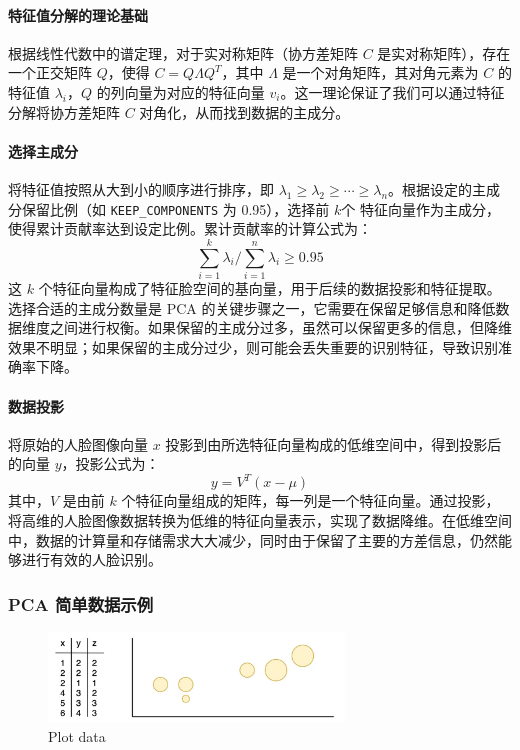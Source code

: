 \documentclass{article}
\begin{document}
\paragraph{特征值分解的理论基础}
根据线性代数中的谱定理，对于实对称矩阵（协方差矩阵 $C$ 是实对称矩阵），存在一个正交矩阵 $Q$，使得 $C = Q\Lambda Q^{T}$，其中 $\Lambda$ 是一个对角矩阵，其对角元素为 $C$ 的特征值 $\lambda_{i}$，$Q$ 的列向量为对应的特征向量 $v_{i}$。这一理论保证了我们可以通过特征分解将协方差矩阵 $C$ 对角化，从而找到数据的主成分。

\paragraph{选择主成分}
将特征值按照从大到小的顺序进行排序，即 $\lambda_{1}\geq\lambda_{2}\geq\cdots\geq\lambda_{n}$。根据设定的主成分保留比例（如 \texttt{KEEP\_COMPONENTS} 为 0.95），选择前 $k$个 特征向量作为主成分，使得累计贡献率达到设定比例。累计贡献率的计算公式为：
\[
\sum_{i = 1}^{k}\lambda_{i}/\sum_{i = 1}^{n}\lambda_{i}\geq0.95
\]
这 $k$ 个特征向量构成了特征脸空间的基向量，用于后续的数据投影和特征提取。选择合适的主成分数量是 PCA 的关键步骤之一，它需要在保留足够信息和降低数据维度之间进行权衡。如果保留的主成分过多，虽然可以保留更多的信息，但降维效果不明显；如果保留的主成分过少，则可能会丢失重要的识别特征，导致识别准确率下降。

\paragraph{数据投影}
将原始的人脸图像向量 $x$ 投影到由所选特征向量构成的低维空间中，得到投影后的向量 $y$，投影公式为：
\[
y = V^{T}(x - \mu)
\]
其中，$V$ 是由前 $k$ 个特征向量组成的矩阵，每一列是一个特征向量。通过投影，将高维的人脸图像数据转换为低维的特征向量表示，实现了数据降维。在低维空间中，数据的计算量和存储需求大大减少，同时由于保留了主要的方差信息，仍然能够进行有效的人脸识别。

\subsubsection{PCA 简单数据示例}

\begin{figure}[H]
    \centering
    \includegraphics[width=0.7\textwidth]{Img/1_MJlSXELJ6-zNJibG5CtqIg.png}
    \caption{Plot data}
\end{figure}
\end{document}
